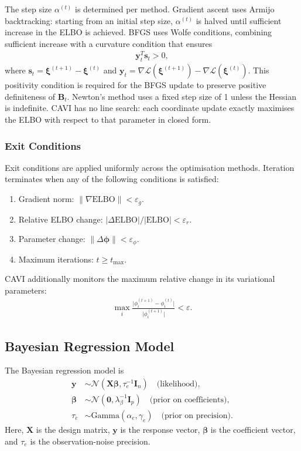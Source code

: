 \documentclass[11pt,a4paper]{article}
\newcommand{\N}{\mathcal{N}}
\newcommand{\ELBO}{\text{ELBO}}
\begin{document}
The step size $\alpha^{(t)}$ is determined per method. Gradient ascent uses Armijo backtracking: starting from an initial step size, $\alpha^{(t)}$ is halved until sufficient increase in the ELBO is achieved. BFGS uses Wolfe conditions, combining sufficient increase with a curvature condition that ensures
\begin{align}
\bm{y}_t^T \bm{s}_t > 0,
\end{align}
where $\bm{s}_t = \bm{\xi}^{(t+1)} - \bm{\xi}^{(t)}$ and $\bm{y}_t = \nabla\mathcal{L}(\bm{\xi}^{(t+1)}) - \nabla\mathcal{L}(\bm{\xi}^{(t)})$. This positivity condition is required for the BFGS update to preserve positive definiteness of $\bm{B}_t$. Newton's method uses a fixed step size of 1 unless the Hessian is indefinite. CAVI has no line search: each coordinate update exactly maximises the ELBO with respect to that parameter in closed form.

\subsubsection*{Exit Conditions}

Exit conditions are applied uniformly across the optimisation methods. Iteration terminates when any of the following conditions is satisfied:
\begin{enumerate}[label=(\roman*)]
  \item Gradient norm: $\lVert \nabla \ELBO \rVert < \varepsilon_g$.
  \item Relative ELBO change: $\lvert \Delta \ELBO \rvert / \lvert \ELBO \rvert < \varepsilon_r$.
  \item Parameter change: $\lVert \Delta \bm{\phi} \rVert < \varepsilon_\phi$.
  \item Maximum iterations: $t \geq t_{\max}$.
\end{enumerate}
CAVI additionally monitors the maximum relative change in its variational parameters:
\begin{align}
\max_i \frac{\lvert \phi_i^{(t+1)} - \phi_i^{(t)} \rvert}{\lvert \phi_i^{(t+1)} \rvert} < \varepsilon.
\end{align}

\subsection{Bayesian Regression Model}

The Bayesian regression model is
\begin{align}
\bm{y} &\sim \N(\bm{X}\bm{\beta}, \tau_e^{-1} \bm{I}_n) \quad \text{(likelihood)},\\
\bm{\beta} &\sim \N(\bm{0}, \lambda_\beta^{-1} \bm{I}_p) \quad \text{(prior on coefficients)},\\
\tau_e &\sim \text{Gamma}(\alpha_e, \gamma_e) \quad \text{(prior on precision)}.
\end{align}
Here, $\bm{X}$ is the design matrix, $\bm{y}$ is the response vector, $\bm{\beta}$ is the coefficient vector, and $\tau_e$ is the observation-noise precision.
\end{document}
